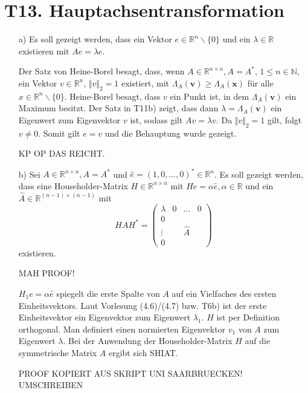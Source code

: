 \documentclass[11pt]{article}
\theoremstyle{plain}
\theoremstyle{definition}
\let\mbb\boldsymbol
\renewcommand\boldsymbol{\mbb}
\renewcommand{\u}{\"{u}}
\newcommand{\rayx}{\Lambda_A(\mbb{x})}
\newcommand{\rayv}{\Lambda_A(\mbb{v})}
\begin{document}
\section*{T13. Hauptachsentransformation}
\begin{itemize}
\item[a)]
Es soll gezeigt werden, dass ein Vektor $e\in \mathbb{R}^n \backslash \{0\}$ und ein $\lambda\in \mathbb{R}$ existieren mit $Ae=\lambda e$.

Der Satz von Heine-Borel besagt, dass, wenn  $A \in \mathbb{R}^{n \times n}, A=A^*$, $1 \leq n \in \mathbb{N}$, ein Vektor $v\in  \mathbb{R}^n$, $\Vert v\Vert_2 = 1$ existiert, mit $\rayv \geq \rayx$ f\u r alle $x\in \mathbb{R}^n \backslash \{0\}$. Heine-Borel besagt, dass $v$ ein Punkt ist, in dem $\rayv$ ein Maximum besitzt. Der Satz in T11b) zeigt, dass dann $\lambda = \rayv$ ein Eigenwert zum Eigenvektor $v$ ist, sodass gilt $Av=\lambda v$. Da $\Vert v\Vert_2 = 1$ gilt, folgt $v \neq 0$. Somit gilt $e=v$ und die Behauptung wurde gezeigt. 

KP OP DAS REICHT.
\item[b)]
Sei $A \in \mathbb{R}^{n \times n}, A=A^*$ und $\hat{e} = (1, 0, ..., 0)^* \in \mathbb{R}^n$. Es soll gezeigt werden, dass eine Householder-Matrix $H \in \mathbb{R}^{n \times n}$ mit $He=\alpha \hat{e}, \alpha \in \mathbb{R}$ und ein $\hat{A} \in \mathbb{R}^{(n-1) \times (n-1)}$ mit
\begin{equation}
HAH^* =
\left(
\begin{array}{c|ccc}
\lambda & 0 & \hdots & 0    \\\hline
0  & & &                    \\
\vdots & & \hat{A} &        \\
0  & & &
\end{array}
\right)
\end{equation}
existieren.\vspace{0.3cm}

MAH PROOF!

$H_1e = \alpha \hat{e}$ spiegelt die erste Spalte von $A$ auf ein Vielfaches des ersten Einheitsvektors. Laut Vorlesung (4.6)/(4.7) bzw. T6b) ist der erste Einheitsvektor ein Eigenvektor zum Eigenwert $\lambda_1$. $H$ ist per Definition orthogonal.
Man definiert einen normierten Eigenvektor $v_1$ von $A$ zum Eigenwert $\lambda$. Bei der Anwendung der Householder-Matrix $H$ auf die symmetrische Matrix $A$ ergibt sich SHIAT.

PROOF KOPIERT AUS SKRIPT UNI SAARBRUECKEN! UMSCHREIBEN


\end{itemize}
\end{document}
